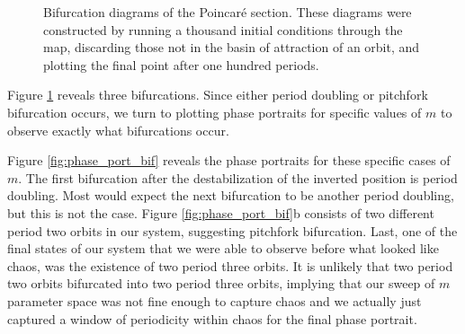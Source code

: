 \documentclass[12pt, letterpaper]{article}
\begin{document}
\begin{figure}[h]
\begin{subfigure}[b]{0.45\textwidth}
    \end{subfigure}
    \caption{Bifurcation diagrams of the Poincaré section. These diagrams were constructed by running a thousand initial conditions through the map, discarding those not in the basin of attraction of an orbit, and plotting the final point after one hundred periods.}
    \label{fig:Bifurcation_diag}
\end{figure}

Figure \ref{fig:Bifurcation_diag} reveals three bifurcations. Since either period doubling or pitchfork bifurcation occurs, we turn to plotting phase portraits for specific values of $m$ to observe exactly what bifurcations occur.  

Figure \ref{fig:phase_port_bif} reveals the phase portraits for these specific cases of $m$. The first bifurcation after the destabilization of the inverted position is period doubling. Most would expect the next bifurcation to be another period doubling, but this is not the case. Figure \ref{fig:phase_port_bif}b consists of two different period two orbits in our system, suggesting pitchfork bifurcation. Last, one of the final states of our system that we were able to observe before what looked like chaos, was the existence of two period three orbits. It is unlikely that two period two orbits bifurcated into two period three orbits, implying that our sweep of $m$ parameter space was not fine enough to capture chaos and we actually just captured a window of periodicity within chaos for the final phase portrait. 
\end{document}
